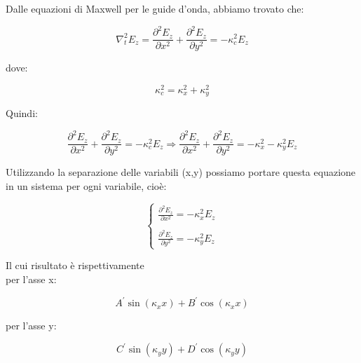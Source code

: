 Dalle equazioni di Maxwell per le guide d'onda, abbiamo trovato che: 

{
    \Large 
    \begin{equation}
        \nabla_t ^{2} E_z 
        = \frac{\partial ^{2} E_z}{\partial x^{2}} + \frac{\partial ^{2} E_z}{\partial y^{2}}
        = - \kappa_c ^{2} E_z
    \end{equation}
}

dove: 

{
    \Large 
    \begin{equation}
        \kappa_c ^{2} = \kappa_x ^{2} + \kappa_y ^{2}
    \end{equation}
}

Quindi: 

{
    \Large 
    \begin{equation}
        \frac{\partial ^{2} E_z}{\partial x^{2}} + \frac{\partial ^{2} E_z}{\partial y^{2}}
        = - \kappa_c ^{2} E_z
        \Rightarrow 
        \frac{\partial ^{2} E_z}{\partial x^{2}} + \frac{\partial ^{2} E_z}{\partial y^{2}}
        =  - \kappa_x ^{2} - \kappa_y ^{2} E_z
    \end{equation}
}

Utilizzando la separazione delle variabili (x,y) possiamo portare questa 
equazione in un sistema per ogni variabile, cioè: 

{
    \Large
    \begin{equation}
        \begin{cases}
            \frac{\partial ^{2} E_z}{\partial x^{2}} 
            = - \kappa_x ^{2} E_z \\ \\
            \frac{\partial ^{2} E_z}{\partial y^{2}} 
            = - \kappa_y ^{2} E_z  
        \end{cases}
    \end{equation}
}


Il cui risultato è rispettivamente \\ 
per l'asse x: 

{
    \Large 
    \begin{equation}
        A^{'} \sin(\kappa_x x) + B^{'} \cos(\kappa_x x) 
    \end{equation}
}

per l'asse y: 

{
    \Large 
    \begin{equation}
        C^{'} \sin(\kappa_y y) + D^{'} \cos(\kappa_y y) 
    \end{equation}
}

